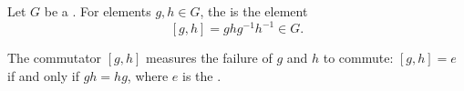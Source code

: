 \begin{definition} \label{definition:commutator_of_two_elements_of_a_group}
   Let $G$ be a . 
   For elements $g,h \in G$, the  is the element
   $$[g,h] = ghg^{-1}h^{-1} \in G.$$

   The commutator $[g,h]$ measures the failure of $g$ and $h$ to commute: $[g,h] = e$ if and only if $gh = hg$, where $e$ is the .
\end{definition}
